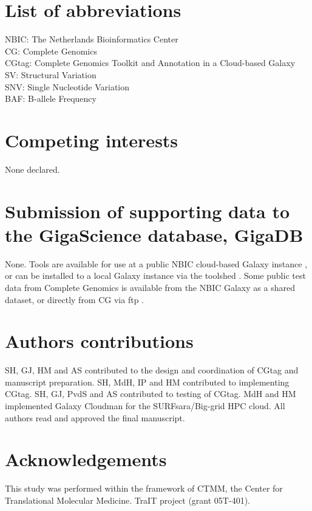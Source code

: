 \documentclass[10pt]{bmc_article}
\newenvironment{bmcformat}{\begin{raggedright}\baselineskip20pt\sloppy\setboolean{publ}{false}}{\end{raggedright}\baselineskip20pt\sloppy}
\begin{document}
\begin{bmcformat}
\section*{List of abbreviations}
NBIC: The Netherlands Bioinformatics Center \\
CG: Complete Genomics \\
CGtag: Complete Genomics Toolkit and Annotation in a Cloud-based Galaxy\\
SV: Structural Variation\\
SNV: Single Nucleotide Variation\\
BAF: B-allele Frequency

\section*{Competing interests}
None declared.


\section*{Submission of supporting data to the GigaScience database, GigaDB}
None. Tools are available for use at a public NBIC cloud-based Galaxy instance \cite{url-nbicgalaxy}, or can be installed to a local Galaxy instance via the toolshed \cite{url-nbictoolshed}. 
Some public test data from Complete Genomics is available from the NBIC Galaxy as a shared dataset, or directly from CG via ftp \cite{url-cgftp}.
    
\section*{Authors contributions}
SH, GJ, HM and AS contributed to the design and coordination of CGtag and manuscript preparation. SH, MdH, IP and HM contributed to implementing CGtag.  SH, GJ, PvdS and AS contributed to testing of CGtag. MdH and HM implemented Galaxy Cloudman for the SURFsara/Big-grid HPC cloud. All authors read and approved the final manuscript. 

    

\section*{Acknowledgements}
This study was performed within the framework of CTMM, the Center for Translational Molecular Medicine. TraIT project (grant 05T-401). \\


\end{bmcformat}
\end{document}

